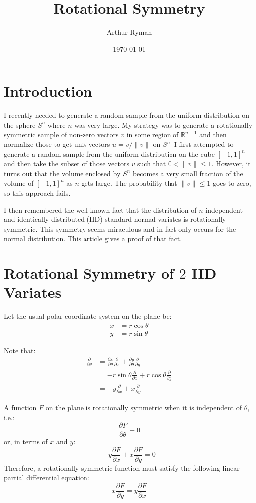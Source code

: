 \documentclass[11pt]{amsart}
\title{Rotational Symmetry}
\author{Arthur Ryman}
\date{\today}                                           %
\begin{document}
\maketitle
\section{Introduction}

I recently needed to generate a random sample from the uniform distribution on the sphere $S^n$ where $n$ was very large.
My strategy was to generate a rotationally symmetric sample of non-zero vectors $v$ in some region of $\mathbb{R}^{n+1}$
and then normalize those to get unit vectors $u = v/\|v\|$ on $S^n$.
I first attempted to generate a random sample from the uniform distribution on the cube $[-1,1]^n$ and then take the subset of those
vectors $v$ such that $0 < \|v\| \leq 1$.
However, it turns out that the volume enclosed by $S^n$ becomes a very small fraction of the volume of $[-1,1]^n$ as $n$ gets large.
The probability that $\|v\| \leq 1$ goes to zero, so this approach fails.

I then remembered the well-known fact that the distribution of $n$ independent and identically  distributed (IID) standard normal variates is rotationally symmetric.
This symmetry seems miraculous and in fact only occurs for the normal distribution.
This article gives a proof of that fact.

\section{Rotational Symmetry of $2$ IID Variates}

Let the usual polar coordinate system on the plane be:
$$
\begin{aligned}
x &= r \cos \theta \\
y &= r \sin \theta
\end{aligned}
$$

Note that:
$$
\begin{aligned}
\frac{\partial}{\partial\theta}	&= \frac{\partial x}{\partial\theta} \frac{\partial}{\partial x} + \frac{\partial y}{\partial\theta} \frac{\partial}{\partial y} \\
						&= -r \sin\theta \frac{\partial}{\partial x} + r \cos\theta \frac{\partial}{\partial y} \\
						&= -y\frac{\partial}{\partial x} + x\frac{\partial}{\partial y} 
\end{aligned}
$$

A function $F$ on the plane is rotationally symmetric when it is independent of $\theta$, i.e.:
$$
\frac{\partial F}{\partial \theta} = 0
$$
or, in terms of $x$ and $y$:
$$
-y\frac{\partial F}{\partial x} + x\frac{\partial F}{\partial y} = 0
$$
Therefore, a rotationally symmetric function must satisfy the following linear partial differential equation:
$$
x\frac{\partial F}{\partial y} = y\frac{\partial F}{\partial x}
$$
\end{document}
